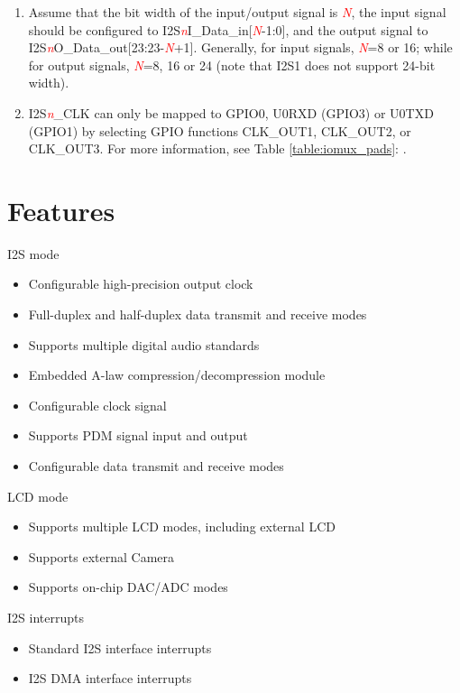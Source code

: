 \documentclass[main\_\_EN.tex]{subfiles}
\begin{document}
\begin{tiplisting}
\vspace{-2em}
\begin{enumerate}
\item Assume that the bit width of the input/output signal is \textcolor{red}{\it{N}}, the input signal should be configured to I2S\textcolor{red}{\it{n}}I\_Data\_in[\textcolor{red}{\it{N}}-1:0], and the output signal to I2S\textcolor{red}{\it{n}}O\_Data\_out[23:23-\textcolor{red}{\it{N}}+1]. Generally, for input signals, \textcolor{red}{\it{N}}=8 or 16; while for output signals, \textcolor{red}{\it{N}}=8, 16 or 24 (note that I2S1 does not support 24-bit width).
\item I2S\textcolor{red}{\it{n}}\_CLK can only be mapped to GPIO0, U0RXD (GPIO3) or U0TXD (GPIO1) by selecting GPIO functions CLK\_OUT1, CLK\_OUT2, or CLK\_OUT3. For more information, see Table \ref{table:iomux_pads}: \textit{}.
\end{enumerate}
\end{tiplisting}

\section{Features}
I2S mode
\begin{itemize}
    \item Configurable high-precision output clock
    \item Full-duplex and half-duplex data transmit and receive modes
    \item Supports multiple digital audio standards
    \item Embedded A-law compression/decompression module
    \item Configurable clock signal
    \item Supports PDM signal input and output
    \item Configurable data transmit and receive modes
\end{itemize}

LCD mode
\begin{itemize}
    \item Supports multiple LCD modes, including external LCD
    \item Supports external Camera
    \item Supports on-chip DAC/ADC modes
\end{itemize}

I2S interrupts
\begin{itemize}
    \item Standard I2S interface interrupts
    \item I2S DMA interface interrupts
\end{itemize}
\end{document}
